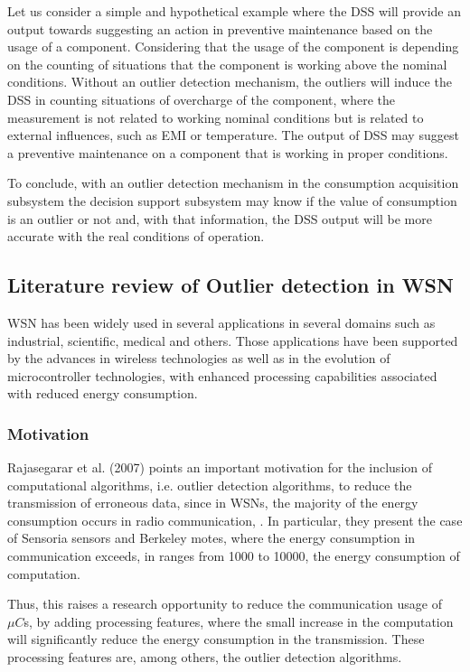 Let us consider a simple and hypothetical example where the \ac{DSS} will provide an output towards suggesting an action in preventive maintenance based on the usage of a component. Considering that the usage of the component is depending on the counting of situations that the component is working above the nominal conditions. Without an outlier detection mechanism, the outliers will induce the \ac{DSS} in counting situations of overcharge of the component, where the measurement is not related to working nominal conditions but is related to external influences, such as \ac{EMI} or temperature. The output of \ac{DSS} may suggest a preventive maintenance on a component that is working in proper conditions.

To conclude, with an outlier detection mechanism in the consumption acquisition subsystem the decision support subsystem may know if the value of consumption is an outlier or not and, with that information, the \ac{DSS} output will be more accurate with the real conditions of operation.


\subsection{Literature review of Outlier detection in \ac{WSN}}
\label{sec:od_wsn}
\ac{WSN} has been widely used in several applications in several domains such as industrial, scientific, medical and others. Those applications have been supported by the advances in wireless technologies as well as in the evolution of microcontroller technologies, with enhanced processing capabilities associated with reduced energy consumption.

\subsubsection{Motivation}

Rajasegarar et al. (2007) points an important motivation for the inclusion of computational algorithms, i.e. outlier detection algorithms, to reduce the transmission of erroneous data, since in WSNs, the majority of the energy consumption occurs in radio communication, \cite{class:rajasegarar:2007}. In particular, they present the case of Sensoria sensors and Berkeley motes, where the energy consumption in communication exceeds, in ranges from 1000 to 10000, the energy consumption of computation.

Thus, this raises a research opportunity to reduce the communication usage of $\mu C$s, by adding processing features, where the small increase in the computation will significantly reduce the energy consumption in the transmission. These processing features are, among others, the outlier detection algorithms.


